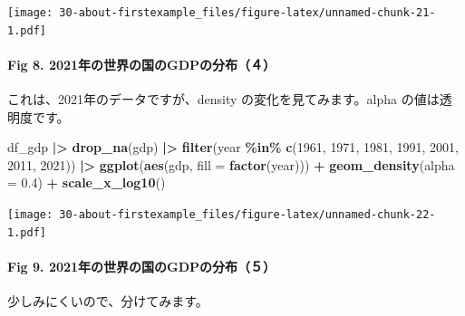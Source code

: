 \documentclass[
  xelatex, ja=standard]{bxjsbook}
\newenvironment{Shaded}{\begin{snugshade}}{\end{snugshade}}
\newcommand{\AttributeTok}[1]{\textcolor[rgb]{0.13,0.29,0.53}{#1}}
\newcommand{\DecValTok}[1]{\textcolor[rgb]{0.00,0.00,0.81}{#1}}
\newcommand{\FloatTok}[1]{\textcolor[rgb]{0.00,0.00,0.81}{#1}}
\newcommand{\FunctionTok}[1]{\textcolor[rgb]{0.13,0.29,0.53}{\textbf{#1}}}
\newcommand{\NormalTok}[1]{#1}
\newcommand{\SpecialCharTok}[1]{\textcolor[rgb]{0.81,0.36,0.00}{\textbf{#1}}}
\theoremstyle{definition}
\theoremstyle{definition}
\theoremstyle{definition}
\theoremstyle{definition}
\theoremstyle{remark}
\begin{document}
\texttt{[image: 30-about-firstexample\_files/figure-latex/unnamed-chunk-21-1.pdf]}

\hypertarget{fig-8.-2021ux5e74ux306eux4e16ux754cux306eux56fdux306egdpux306eux5206ux5e03uxff14}{%
\paragraph{Fig 8. 2021年の世界の国のGDPの分布（４）}\label{fig-8.-2021ux5e74ux306eux4e16ux754cux306eux56fdux306egdpux306eux5206ux5e03uxff14}}

これは、2021年のデータですが、density の変化を見てみます。alpha の値は透明度です。

\begin{Shaded}
\begin{Highlighting}[]
\NormalTok{df\_gdp }\SpecialCharTok{|\textgreater{}} \FunctionTok{drop\_na}\NormalTok{(gdp) }\SpecialCharTok{|\textgreater{}} 
  \FunctionTok{filter}\NormalTok{(year }\SpecialCharTok{\%in\%} \FunctionTok{c}\NormalTok{(}\DecValTok{1961}\NormalTok{, }\DecValTok{1971}\NormalTok{, }\DecValTok{1981}\NormalTok{, }\DecValTok{1991}\NormalTok{, }\DecValTok{2001}\NormalTok{, }\DecValTok{2011}\NormalTok{, }\DecValTok{2021}\NormalTok{)) }\SpecialCharTok{|\textgreater{}}
  \FunctionTok{ggplot}\NormalTok{(}\FunctionTok{aes}\NormalTok{(gdp, }\AttributeTok{fill =} \FunctionTok{factor}\NormalTok{(year))) }\SpecialCharTok{+} \FunctionTok{geom\_density}\NormalTok{(}\AttributeTok{alpha =} \FloatTok{0.4}\NormalTok{) }\SpecialCharTok{+} \FunctionTok{scale\_x\_log10}\NormalTok{()}
\end{Highlighting}
\end{Shaded}

\texttt{[image: 30-about-firstexample\_files/figure-latex/unnamed-chunk-22-1.pdf]}

\hypertarget{fig-9.-2021ux5e74ux306eux4e16ux754cux306eux56fdux306egdpux306eux5206ux5e03uxff15}{%
\paragraph{Fig 9. 2021年の世界の国のGDPの分布（５）}\label{fig-9.-2021ux5e74ux306eux4e16ux754cux306eux56fdux306egdpux306eux5206ux5e03uxff15}}

少しみにくいので、分けてみます。
\end{document}
